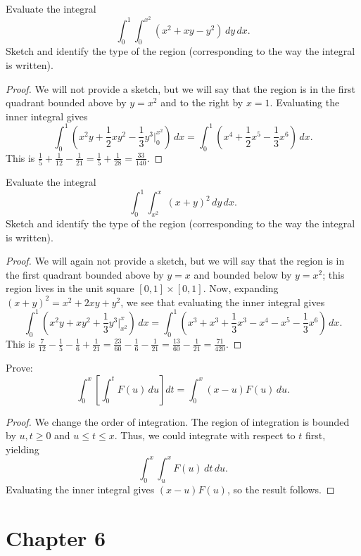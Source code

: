 \documentclass[openany]{book}
\begin{document}
\begin{prob}[21]
    Evaluate the integral
    \[
    \int_{0}^{1} \int_{0}^{x^2} \left(x^2 + xy - y^2\right) \, dy \, dx.
    \]
    Sketch and identify the type of the region (corresponding to the way the integral is written).
\end{prob}
\begin{proof}
    We will not provide a sketch, but we will say that the region is in the first quadrant bounded above by $y=x^2$ and to the right by $x=1$. Evaluating the inner integral gives
    \[\int_0^1\left(x^2y+\frac12xy^2-\frac13y^3\bigg|_0^{x^2}\right)\,dx=\int_0^1\left(x^4+\frac12x^5-\frac13x^6\right)\,dx.\]
    This is $\frac15+\frac1{12}-\frac1{21}=\frac15+\frac1{28}=\frac{33}{140}$.
\end{proof}

\begin{prob}[23]
    Evaluate the integral
    \[
    \int_{0}^{1} \int_{x^2}^{x} (x + y)^2 \, dy \, dx.
    \]
    Sketch and identify the type of the region (corresponding to the way the integral is written).
\end{prob}
\begin{proof}
    We will again not provide a sketch, but we will say that the region is in the first quadrant bounded above by $y=x$ and bounded below by $y=x^2$; this region lives in the unit square $[0,1]\times[0,1]$. Now, expanding $(x+y)^2=x^2+2xy+y^2$, we see that evaluating the inner integral gives
    \[\int_0^1\left(x^2y+xy^2+\frac13y^3\bigg|_{x^2}^x\right)\,dx=\int_0^1\left(x^3+x^3+\frac13x^3-x^4-x^5-\frac13x^6\right)\,dx.\]
    This is $\frac7{12}-\frac15-\frac16+\frac1{21}=\frac{23}{60}-\frac{1}{6}-\frac{1}{21}=\frac{13}{60}-\frac{1}{21}=\frac{71}{420}$.
\end{proof}

\begin{prob}[33]
    Prove:
    \[
    \int_{0}^{x} \left[ \int_{0}^{t} F(u) \, du \right] dt = \int_{0}^{x} (x - u) F(u) \, du.
    \]
\end{prob}
\begin{proof}
    We change the order of integration. The region of integration is bounded by $u,t\ge0$ and $u\le t\le x$. Thus, we could integrate with respect to $t$ first, yielding
    \[\int_0^x\int_u^xF(u)\,dt\,du.\]
    Evaluating the inner integral gives $(x-u)F(u)$, so the result follows.
\end{proof}


\section{Chapter 6}
\end{document}
